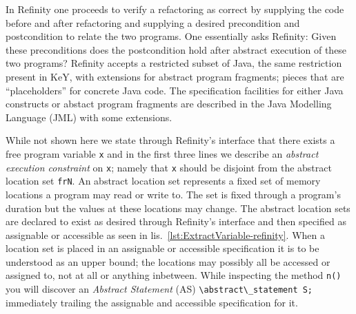 In Refinity one proceeds to verify a refactoring as correct by supplying the code before and after refactoring and supplying a desired precondition and postcondition to relate
the two programs. One essentially asks Refinity: Given these preconditions does the postcondition hold after abstract execution of these two programs? Refinity accepts a restricted
subset of Java, the same restriction present in KeY, with extensions for abstract program fragments; pieces that are ``placeholders'' for concrete Java code.
The specification facilities for either Java constructs or abstact program fragments are described in the Java Modelling Language (JML) with some extensions.

While not shown here we state through Refinity's interface that there exists a free program variable \lstinline[style=refinity]|x| and in the first three lines we describe
an \emph{abstract execution constraint} on \lstinline[style=refinity]|x|; namely that \lstinline[style=refinity]|x| should be disjoint from the abstract location set \lstinline[style=refinity]|frN|.
An abstract location set represents a fixed set of memory locations a program may read or write to. The set is fixed through a program's duration but the values at these locations may change.
The abstract location sets are declared to exist as desired through Refinity's interface and then specified as assignable or accessible as seen in lis.~\ref{lst:ExtractVariable-refinity}.
When a location set is placed in an assignable or accessible specification it is to be understood as an upper bound; the locations may possibly all be accessed or assigned to, not at all or
anything inbetween. While inspecting the method \lstinline[style=refinity]|n()| you will discover an \emph{Abstract Statement} (AS) \lstinline[style=refinity]|\abstract\_statement S;|
immediately trailing the assignable and accessible specification for it.

